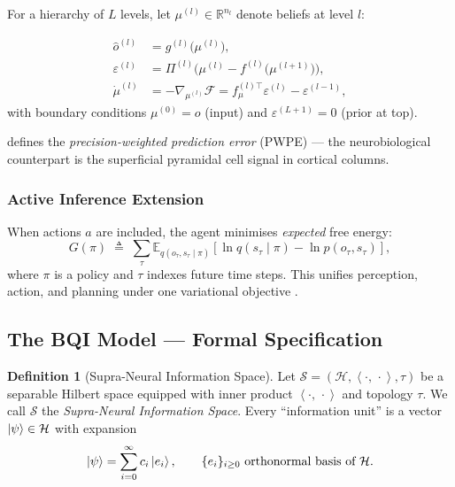 \documentclass[12pt,a4paper]{article}
\theoremstyle{plain}
\theoremstyle{definition}
\newtheorem{definition}[theorem]{Definition}
\theoremstyle{remark}
\newcommand{\vF}{\mathcal{F}}
\newcommand{\vS}{\mathcal{S}}
\newcommand{\vH}{\mathcal{H}}
\newcommand{\E}{\mathbb{E}}
\newcommand{\R}{\mathbb{R}}
\newcommand{\inner}[2]{\left\langle#1,\,#2\right\rangle}
\begin{document}
For a hierarchy of $L$ levels, let $\mu^{(l)} \in \R^{n_l}$ denote beliefs at level $l$:

\begin{tcolorbox}[mathbox, title={Definition 3.2 — Hierarchical BPC Recurrence}]
\begin{align}
  \hat{o}^{(l)}      &= g^{(l)}\!\bigl(\mu^{(l)}\bigr), \label{eq:hbpc_obs}\\[4pt]
  \varepsilon^{(l)}   &= \Pi^{(l)}\bigl(\mu^{(l)} - f^{(l)}\!\bigl(\mu^{(l+1)}\bigr)\bigr),
                         \label{eq:pe_state}\\[4pt]
  \dot{\mu}^{(l)}     &= -\nabla_{\mu^{(l)}}\vF
                       = f_{\mu}^{(l)\top}\varepsilon^{(l)} - \varepsilon^{(l-1)},
                         \label{eq:belief_update}
\end{align}
with boundary conditions $\mu^{(0)} = o$ (input) and $\varepsilon^{(L+1)} = 0$ (prior at top).
\end{tcolorbox}

 defines the \emph{precision-weighted prediction error} (PWPE) —
the neurobiological counterpart is the superficial pyramidal cell signal in cortical columns.

\subsubsection{Active Inference Extension}

When actions $a$ are included, the agent minimises \emph{expected} free energy:
\begin{equation}
  G(\pi) \;\triangleq\; \sum_\tau \E_{q(o_\tau, s_\tau \mid \pi)}\!\left[
    \ln q(s_\tau \mid \pi) - \ln p(o_\tau, s_\tau)
  \right],
  \label{eq:expected_FE}
\end{equation}
where $\pi$ is a policy and $\tau$ indexes future time steps.
This unifies perception, action, and planning under one variational objective \citep{Friston2010}.

\subsection{The BQI Model — Formal Specification}
\label{subsec:bqi_formal}

\begin{definition}[Supra-Neural Information Space]
Let $\vS = (\vH, \inner{\cdot}{\cdot}, \tau)$ be a separable Hilbert space equipped with inner product $\inner{\cdot}{\cdot}$ and topology $\tau$.
We call $\vS$ the \emph{Supra-Neural Information Space}.
Every ``information unit'' is a vector $\ket{\psi} \in \vH$ with expansion
\begin{equation}
  \ket{\psi} = \sum_{i=0}^{\infty} c_i\ket{e_i}, \qquad \{e_i\}_{i\geq 0}
               \text{ orthonormal basis of } \vH.
\end{equation}
\end{definition}
\end{document}
